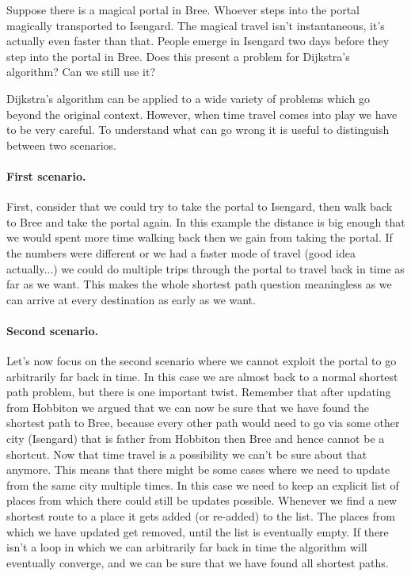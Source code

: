 Suppose there is a magical portal in Bree. Whoever steps into the portal magically transported to Isengard. The magical travel isn't instantaneous, it's actually even faster than that. People emerge in Isengard two days before they step into the portal in Bree. Does this present a problem for  Dijkstra's algorithm? Can we still use it?

\solution
Dijkstra's algorithm can be applied to a wide variety of problems which go beyond the original context. However, when time travel comes into play we have to be very careful.
To understand what can go wrong it is useful to distinguish between two scenarios.

\paragraph{First scenario.}First, consider that we could try to take the portal to Isengard, then walk back to Bree and take the portal again. In this example the distance is big enough that we would spent more time walking back then we gain from taking the portal. If the numbers were different or we had a faster mode of travel (good idea actually...) we could do multiple trips through the portal to travel back in time as far as we want. This makes the whole shortest path question meaningless as we can arrive at every destination as early as we want. 

\paragraph{Second scenario.}Let's now focus on the second scenario where we cannot exploit the portal to go arbitrarily far back in time. In this case we are almost back to a normal shortest path problem, but there is one important twist. Remember that after updating from Hobbiton we argued that we can now be sure that we have found the shortest path to Bree, because every other path would need to go via some other city (Isengard) that is father from Hobbiton then Bree and hence cannot be a shortcut. Now that time travel is a possibility we can't be sure about that anymore. This means that there might be some cases where we need to update from the same city multiple times. In this case we need to keep an explicit list of places from which there could still be updates possible. Whenever we find a new shortest route to a place it gets added (or re-added) to the list. The places from which we have updated get removed, until the list is eventually empty. If there isn't a loop in which we can arbitrarily far back in time the algorithm will eventually converge, and we can be sure that we have found all shortest paths. 

